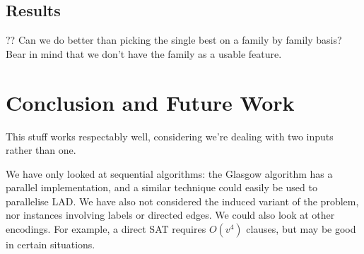 \documentclass{llncs}
\begin{document}
\subsection{Results}

?? Can we do better than picking the single best on a family by family basis? Bear in mind that we
don't have the family as a usable feature.

\section{Conclusion and Future Work}

This stuff works respectably well, considering we're dealing with two inputs rather than one.

We have only looked at sequential algorithms: the Glasgow algorithm has a parallel implementation,
and a similar technique could easily be used to parallelise LAD.  We have also not considered the
induced variant of the problem, nor instances involving labels or directed edges.  We could also
look at other encodings. For example, a direct SAT requires $O(v^4)$ clauses, but may be good in
certain situations.



\end{document}
